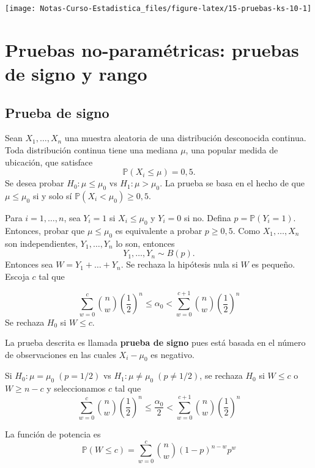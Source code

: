 \documentclass[
  12pt,
]{book}
\begin{document}
\begin{center}\texttt{[image: Notas-Curso-Estadistica\_files/figure-latex/15-pruebas-ks-10-1]} \end{center}

\hypertarget{pruebas-no-paramuxe9tricas-pruebas-de-signo-y-rango}{%
\chapter{Pruebas no-paramétricas: pruebas de signo y rango}\label{pruebas-no-paramuxe9tricas-pruebas-de-signo-y-rango}}

\hypertarget{prueba-de-signo}{%
\section{Prueba de signo}\label{prueba-de-signo}}

Sean \(X_1,\dots,X_n\) una muestra aleatoria de una distribución desconocida continua. Toda distribución continua tiene una mediana \(\mu\), una popular medida de ubicación, que satisface
\[\mathbb P(X_i\leq \mu)=0,5.\]
Se desea probar
\(H_0: \mu\leq \mu_0\) vs \(H_1: \mu >\mu_0.\)
La prueba se basa en el hecho de que \(\mu\leq \mu_0\) si y solo sí \(\mathbb P(X_i<\mu_0)\geq 0,5\).

Para \(i=1,\dots,n\), sea \(Y_i = 1\) si \(X_i\leq \mu_0\) y \(Y_i = 0\) si no. Defina \(p = \mathbb P(Y_i = 1)\). Entonces, probar que \(\mu\leq \mu_0\) es equivalente a probar \(p \geq 0,5\). Como \(X_1,\dots,X_n\) son independientes, \(Y_1,\dots,Y_n\) lo son, entonces
\[Y_1,\dots,Y_n\sim B(p).\]
Entonces sea \(W = Y_1+\dots+Y_n\). Se rechaza la hipótesis nula si \(W\) es pequeño. Escoja \(c\) tal que

\[\sum_{w=0}^c{n\choose w}\left( \dfrac 12\right)^n \leq \alpha_0 < \sum_{w=0}^{c+1}{n\choose w}\left( \dfrac 12\right)^n\]
Se rechaza \(H_0\) si \(W\leq c\).

La prueba descrita es llamada \textbf{prueba de signo} pues está basada en el número de observaciones en las cuales \(X_i-\mu_0\) es negativo.

Si \(H_0: \mu = \mu_0\; (p=1/2)\) vs \(H_1: \mu\neq \mu_0 \;(p\neq 1/2)\), se rechaza \(H_0\) si \(W\leq c\) o \(W \geq n-c\) y seleccionamos \(c\) tal que
\[\sum_{w=0}^c{n\choose w}\left( \dfrac 12\right)^n \leq \dfrac{\alpha_0}{2} < \sum_{w=0}^{c+1}{n\choose w}\left( \dfrac 12\right)^n\]

La función de potencia es
\[\mathbb P(W\leq c) =\sum_{w=0}^c{n\choose w}(1-p)^{n-w}p^w \]
\end{document}
